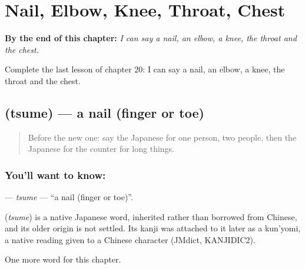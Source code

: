 
\chapter{Nail, Elbow, Knee, Throat, Chest}
\label{ch:ja-nail-elbow-knee-throat-chest}

\begin{chapteropening}
\textbf{By the end of this chapter:} \emph{I can say a nail, an elbow, a knee, the throat and the chest.}

Complete the last lesson of chapter 20: I can say a nail, an elbow, a knee, the throat and the chest.
\end{chapteropening}

\section[\texorpdfstring{\ja{つめ} (tsume)}{つめ (tsume)}]{ (tsume) — a nail (finger or toe)}

\label{lesson:JA-C20-tsume}



\begin{quote}
Before the new one: say the Japanese for one person, two people, then the Japanese for the counter for long things.
\end{quote}

\subsection*{You'll want to know: }
\textbf{} — \emph{tsume} — \textquotedblleft{}a nail (finger or toe)\textquotedblright{}.

\begin{cousinweb}
\textbf{} (\emph{tsume}) is a native Japanese word, inherited rather than borrowed from Chinese, and its older origin is not settled. Its kanji was attached to it later as a kun'yomi, a native reading given to a Chinese character (JMdict, KANJIDIC2).
\end{cousinweb}

\begin{grammarlens}[title={What you've built}]
One more word for this chapter.
\end{grammarlens}

